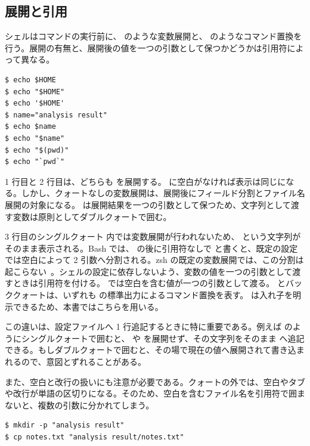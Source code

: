 \subsection{展開と引用}

シェルはコマンドの実行前に、 のような変数展開と、 のようなコマンド置換を行う。展開の有無と、展開後の値を一つの引数として保つかどうかは引用符によって異なる。

\begin{lstlisting}[numbers=none, xleftmargin=2\zw]
$ echo $HOME
$ echo "$HOME"
$ echo '$HOME'
$ name="analysis result"
$ echo $name
$ echo "$name"
$ echo "$(pwd)"
$ echo "`pwd`"
\end{lstlisting}

1 行目と 2 行目は、どちらも  を展開する。 に空白がなければ表示は同じになる。しかし、クォートなしの変数展開は、展開後にフィールド分割とファイル名展開の対象になる。 は展開結果を一つの引数として保つため、文字列として渡す変数は原則としてダブルクォートで囲む。

3 行目のシングルクォート  内では変数展開が行われないため、 という文字列がそのまま表示される。Bash では、 の後に引用符なしで  と書くと、既定の設定では空白によって 2 引数へ分割される。zsh の既定の変数展開では、この分割は起こらない~\cite{zsh_expansion}。シェルの設定に依存しないよう、変数の値を一つの引数として渡すときは引用符を付ける。 では空白を含む値が一つの引数として渡る。 とバッククォートは、いずれも  の標準出力によるコマンド置換を表す。 は入れ子を明示できるため、本書ではこちらを用いる。

この違いは、設定ファイルへ 1 行追記するときに特に重要である。例えば  のようにシングルクォートで囲むと、 や  を展開せず、その文字列をそのまま  へ追記できる。もしダブルクォートで囲むと、その場で現在の値へ展開されて書き込まれるので、意図とずれることがある。

また、空白と改行の扱いにも注意が必要である。クォートの外では、空白やタブや改行が単語の区切りになる。そのため、空白を含むファイル名を引用符で囲まないと、複数の引数に分かれてしまう。

\begin{lstlisting}[numbers=none, xleftmargin=2\zw]
$ mkdir -p "analysis result"
$ cp notes.txt "analysis result/notes.txt"
\end{lstlisting}

